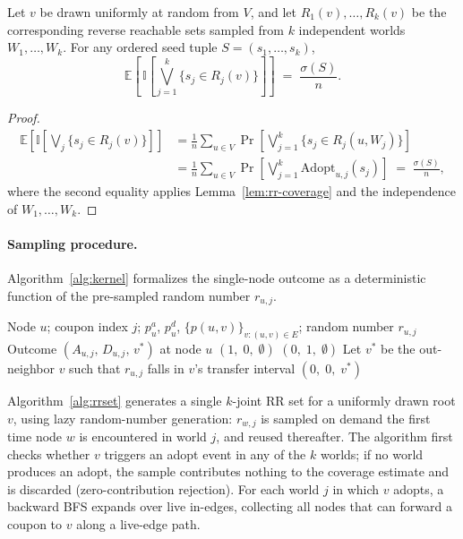 \documentclass[sigconf]{acmart}
\begin{document}
\begin{lemma}[Unbiasedness]
\label{lem:unbiased}
Let $v$ be drawn uniformly at random from $V$, and let $R_1(v), \ldots, R_k(v)$ be the corresponding reverse reachable sets sampled from $k$ independent worlds $W_1, \ldots, W_k$.  For any ordered seed tuple $S = (s_1, \ldots, s_k)$,
\[
  \mathbb{E}\!\left[\,\mathbb{I}\!\left[\bigvee_{j=1}^{k} \{s_j \in R_j(v)\}\right]\right]
  \;=\; \frac{\sigma(S)}{n}.
\]
\end{lemma}

\begin{proof}
\begin{align*}
  \mathbb{E}\!\left[\mathbb{I}\!\left[\bigvee_j \{s_j \in R_j(v)\}\right]\right]
  &= \frac{1}{n}\sum_{u \in V}
     \Pr\!\left[\bigvee_{j=1}^{k} \{s_j \in R_j(u,W_j)\}\right] \\
  &= \frac{1}{n}\sum_{u \in V}
     \Pr\!\left[\bigvee_{j=1}^{k} \mathrm{Adopt}_{u,j}(s_j)\right]
  \;=\; \frac{\sigma(S)}{n},
\end{align*}
where the second equality applies Lemma~\ref{lem:rr-coverage} and the independence of $W_1,\ldots,W_k$.
\end{proof}

\paragraph{Sampling procedure.}
Algorithm~\ref{alg:kernel} formalizes the single-node outcome as a deterministic function of the pre-sampled random number $r_{u,j}$.

\begin{algorithm}[t]
\caption{Single-Node Transition Kernel in World $W_j$}
\label{alg:kernel}
\begin{algorithmic}[1]
\Require Node $u$; coupon index $j$; $p_u^a$, $p_u^d$, $\{p(u,v)\}_{v:(u,v)\in E}$; random number $r_{u,j}$
\Ensure Outcome $(A_{u,j},\, D_{u,j},\, v^*)$ at node $u$
  \State \Return $(1,\; 0,\; \emptyset)$ 
  \State \Return $(0,\; 1,\; \emptyset)$ 
\Else
  \State Let $v^*$ be the out-neighbor $v$ such that $r_{u,j}$ falls in $v$'s transfer interval
  \State \Return $(0,\; 0,\; v^*)$ 
\EndIf
\end{algorithmic}
\end{algorithm}

Algorithm~\ref{alg:rrset} generates a single $k$-joint RR set for a uniformly drawn root $v$, using lazy random-number generation: $r_{w,j}$ is sampled on demand the first time node $w$ is encountered in world $j$, and reused thereafter. The algorithm first checks whether $v$ triggers an adopt event in any of the $k$ worlds; if no world produces an adopt, the sample contributes nothing to the coverage estimate and is discarded (zero-contribution rejection). For each world $j$ in which $v$ adopts, a backward BFS expands over live in-edges, collecting all nodes that can forward a coupon to $v$ along a live-edge path.
\end{document}
